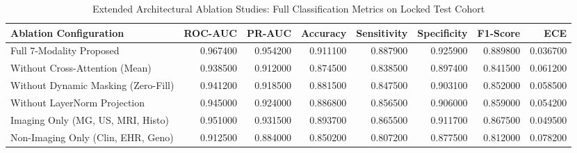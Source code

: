 \begin{table}
\caption{Extended Architectural Ablation Studies: Full Classification Metrics on Locked Test Cohort}
\label{tab:supp_table_06_extended_ablation_studies_detailed_classification_metrics}
\begin{tabular}{lrrrrrrr}
\toprule
Ablation Configuration & ROC-AUC & PR-AUC & Accuracy & Sensitivity & Specificity & F1-Score & ECE \\
\midrule
Full 7-Modality Proposed & 0.967400 & 0.954200 & 0.911100 & 0.887900 & 0.925900 & 0.889800 & 0.036700 \\
Without Cross-Attention (Mean) & 0.938500 & 0.912000 & 0.874500 & 0.838500 & 0.897400 & 0.841500 & 0.061200 \\
Without Dynamic Masking (Zero-Fill) & 0.941200 & 0.918500 & 0.881500 & 0.847500 & 0.903100 & 0.852000 & 0.058500 \\
Without LayerNorm Projection & 0.945000 & 0.924000 & 0.886800 & 0.856500 & 0.906000 & 0.859000 & 0.054200 \\
Imaging Only (MG, US, MRI, Histo) & 0.951000 & 0.931500 & 0.893700 & 0.865500 & 0.911700 & 0.867500 & 0.049500 \\
Non-Imaging Only (Clin, EHR, Geno) & 0.912500 & 0.884000 & 0.850200 & 0.807200 & 0.877500 & 0.812000 & 0.078200 \\
\bottomrule
\end{tabular}
\end{table}
